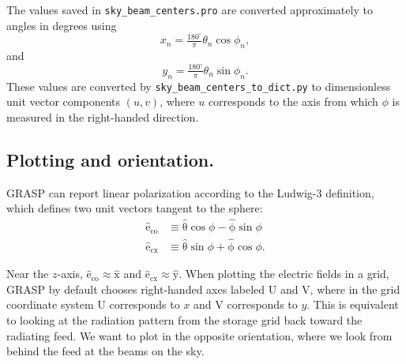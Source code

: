 \documentclass[10pt,english]{article}
\renewcommand{\vec}[ 1 ]{\boldsymbol{\mathrm{#1}}}
\begin{document}
The values saved in \texttt{sky\_beam\_centers.pro} are converted approximately to angles in degrees using
\begin{equation*}
x_{n} = \tfrac{180^{\circ}}{\pi} \theta_{n} \cos \phi_{n},
\end{equation*}
and
\begin{equation*}
y_{n} = \tfrac{180^{\circ}}{\pi} \theta_{n} \sin \phi_{n}.
\end{equation*}
These values are converted by \texttt{sky\_beam\_centers\_to\_dict.py} to dimensionless unit vector components $(u, v)$, where $u$ corresponds to the axis from which $\phi$ is measured in the right-handed direction.

\subsection*{Plotting and orientation.}

GRASP can report linear polarization according to the Ludwig-3 definition, which defines two unit vectors tangent to the sphere:
\begin{align*}
\hat{\vec{e}}_{\text{co}} &\equiv \hat{\vec{\theta}} \cos \phi - \hat{\vec{\phi}} \sin \phi \\
\hat{\vec{e}}_{\text{cx}} & \equiv \hat{\vec{\theta}} \sin \phi + \hat{\vec{\phi}} \cos \phi.
\end{align*}

Near the $z$-axis, $\hat{\vec{e}}_{\text{co}} \approx \hat{\vec{x}}$ and $\hat{\vec{e}}_{\text{cx}} \approx \hat{\vec{y}}$. When plotting the electric fields in a grid, GRASP by default chooses right-handed axes labeled U and V, where in the grid coordinate system U corresponds to $x$ and V corresponds to $y$. This is equivalent to looking at the radiation pattern from the storage grid back toward the radiating feed. We want to plot in the opposite orientation, where we look from behind the feed at the beams on the sky.
\end{document}
